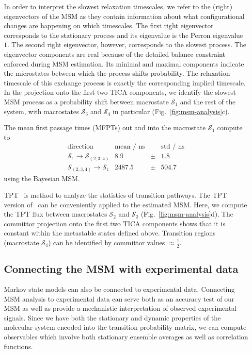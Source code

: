 \documentclass[9pt,tutorial]{livecoms}
\begin{document}
In order to interpret the slowest relaxation timescales, we refer to the (right) eigenvectors of the MSM as they contain information about what configurational changes are happening on which timescales.
The first right eigenvector corresponds to the stationary process and its eigenvalue is the Perron eigenvalue $1$.
The second right eigenvector, however, corresponds to the slowest process.
The eigenvector components are real because of the detailed balance constraint enforced during MSM estimation.
Its minimal and maximal components indicate the microstates between which the process shifts probability.
The relaxation timescale of this exchange process is exactly the corresponding implied timescale.
In the projection onto the first two TICA components, we identify the slowest MSM process as a probability shift between macrostate $\mathcal{S}_1$ and the rest of the system, with macrostates $\mathcal{S}_3$ and $\mathcal{S}_4$ in particular (Fig.~\ref{fig:msm-analysis}c).

The mean first passage times (MFPTs) out and into the macrostate $\mathcal{S}_1$ compute to
\[ \begin{array}{crcr}
\textrm{direction} & \textrm{mean / ns} && \textrm{std / ns} \\
\hline
\mathcal{S}_1 \to \mathcal{S}_{(2,3,4)} & 8.9 & \pm & 1.8 \\
\mathcal{S}_{(2,3,4)} \to \mathcal{S}_1 & 2487.5 & \pm &  504.7
\end{array}\]
using the Bayesian MSM.

TPT~\cite{weinan-tpt,metzner-msm-tpt} is method to analyze the statistics of transition pathways. The TPT version of~\cite{noe-folding-pathways} can be conveniently applied to the estimated MSM. Here, we compute the TPT flux between macrostates $\mathcal{S}_2$ and $\mathcal{S}_3$ (Fig.~\ref{fig:msm-analysis}d).
The committor projection onto the first two TICA components shows that it is constant within the metastable states defined above.
Transition regions (macrostate $\mathcal{S}_4$) can be identified by committor values $\approx \frac{1}{2}$.

\subsection{Connecting the MSM with experimental data}
Markov state models can also be connected to experimental data. Connecting MSM analysis to experimental data can serve both as an accuracy test of our MSM as well as provide a mechanistic interpretation of observed experimental signals. Since we have both the stationary and dynamic properties of the molecular system encoded into the transition probability matrix, we can compute observables which involve both stationary ensemble averages as well as correlation functions.  
\end{document}
